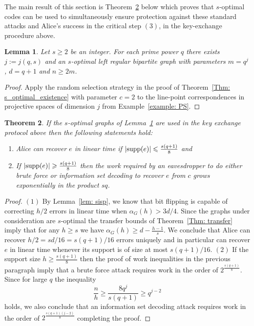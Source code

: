 \documentclass[12pt]{amsart}
\newtheorem{lemma}{Lemma}[section]
\newtheorem{theorem}[lemma]{Theorem}
\theoremstyle{definition}
\renewcommand{\geq}{\geqslant}
\renewcommand{\leq}{\leqslant}
\newcommand{\1}{\ensuremath{\mathbb{1}}}
\begin{document}
The main result of this section is Theorem~\ref{thm: PQK} below which proves that $s$-optimal codes can be used to simultaneously ensure protection against these standard attacks and Alice's success in the critical step $(3)$, in the key-exchange procedure above.

\begin{lemma}\label{lem: existence} Let $s\geq 2$ be an integer. For each prime power $q$ there exists $j:=j(q,s)$ and an $s$-optimal left regular bipartite graph with parameters $m=q^j$, $d=q+1$ and $n \geq 2m$.
\end{lemma}
\begin{proof} Apply the random selection strategy in the proof of Theorem~\ref{Thm: s_optimal_existence} with parameter $c=2$ to the line-point correspondences in projective spaces of dimension $j$ from Example~\ref{example: PS}.
\end{proof}

\begin{theorem}\label{thm: PQK} If the $s$-optimal graphs of Lemma~\ref{lem: existence} are used in the key exchange protocol above then the following statements hold:
\begin{enumerate}
\item Alice can recover $e$ in linear time if $|{\rm supp}(e)|\leq \frac{s(q+1)}{8}$ and
\item If $|{\rm supp}(e)|\geq \frac{s(q+1)}{8}$ then the work required by an eavesdropper to do either brute force or information set decoding to recover $e$ from $c$ grows exponentially in the product $sq$.
\end{enumerate}
\end{theorem}
\begin{proof} $(1)$ By Lemma~\ref{lem: sisp}, we know that bit flipping is capable of correcting $h/2$ errors in linear time when  $\alpha_G(h)> 3d/4$. Since the graphs under consideration are $s$-optimal the transfer bounds of Theorem~\ref{Thm: transfer} imply that for any $h \geq s$ we have $\alpha_G(h)\geq d-\frac{h-1}{s}$. We conclude that Alice can recover $h/2=sd/16=s(q+1)/16$ errors uniquely and in particular can recover $e$ in linear time whenever its support is of size at most $s(q+1)/16$. $(2)$ If the support size $h\geq \frac{s(q+1)}{8}$ then the proof of work inequalities in the previous paragraph imply that a brute force attack requires work in the order of $2^{\frac{s(q+1)}{8}}$. 
Since for large $q$ the inequality
\[\frac{n}{h} \geq \frac{8q^j}{s(q+1)}\geq q^{j-2}\]
holds, we also conclude that an information set decoding attack requires work in the order of $2^{\frac{s(q+1)(j-2)}{8}}$ completing the proof. 
\end{proof}
\end{document}
